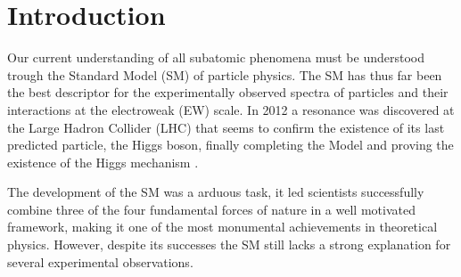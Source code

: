 
\newpage

\chapter{Introduction}
\label{Chap:Introduction}


Our current understanding of all subatomic phenomena must be understood trough the Standard Model (SM) of particle physics. 
%
The SM has thus far been the best descriptor for the experimentally observed spectra of particles and their interactions at the electroweak (EW) scale. 
%
In 2012 a resonance was discovered at the Large Hadron Collider (LHC) that seems to confirm the existence of its last predicted particle, the Higgs boson, finally completing the Model and proving the existence of the Higgs mechanism \cite{Aad_2012,chatrchyan2012observation,
collaborations2015combined,collaborations2016measurements}. 

The development of the SM was a arduous task, it led scientists successfully combine three of the four fundamental forces of nature in a well motivated framework, making it one of the most monumental achievements in theoretical physics.
%
However, despite its successes the SM still lacks a strong explanation for several experimental observations. 
%

